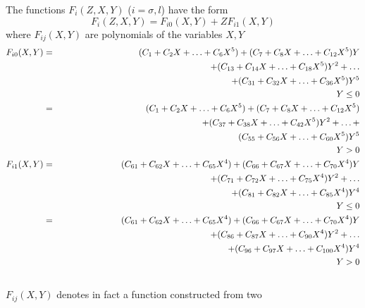 The functions $F_i(Z,X,Y)$ ($ i=\sigma,l $) have the form
\begin{equation}
 F_i(Z,X,Y) = F_{i0}(X,Y)+ZF_{i1}(X,Y)
\end{equation}
where $F_{ij}(X,Y)$ are polynomials of the variables $X,Y$
\begin{eqnarray}
F_{i0}(X,Y) & = &  (C_1+C_2X+\ldots+C_6X^5)+(C_7+C_8X+\ldots+C_{12}X^5)Y
                                                             \nonumber \\
          &   & +(C_{13}+C_{14}X+\ldots + C_{18}X^5)Y^2+\ldots \nonumber \\
          &   & +(C_{31}+C_{32}X+\ldots+C_{36}X^5)Y^5        \nonumber \\
          &   & \mbox{\hspace{11cm}}  Y\leq 0      \nonumber \\
          & = &  (C_1+C_2X+\ldots+C_6X^5)+(C_7+C_8X+\ldots+C_{12}X^5)
                                                             \nonumber \\
          &   & +(C_{37}+C_{38}X+\ldots+C_{42}X^5)Y^2+\ldots+ \nonumber \\
          &   &  (C_{55}+C_{56}X+\ldots+C_{60}X^5)Y^5        \nonumber \\
          &   & \mbox{\hspace{11cm}}  Y > 0        \nonumber \\
F_{i1}(X,Y) & = &  (C_{61}+C_{62}X+\ldots+C_{65}X^4)
                +(C_{66}+C_{67}X+\ldots+C_{70}X^4)Y          \nonumber \\
          &   & +(C_{71}+C_{72}X+\ldots+C_{75}X^4)Y^2+\ldots \nonumber \\
          &   & +(C_{81}+C_{82}X+\ldots+C_{85}X^4) Y^4       \nonumber \\
          &   &   \mbox{\hspace{11cm}}  Y\leq 0    \nonumber \\
          & = &  (C_{61}+C_{62}X+\ldots+C_{65}X^4)
                +(C_{66}+C_{67}X+\ldots+C_{70}X^4)Y          \nonumber \\
          &   & +(C_{86}+C_{87}X+\ldots+C_{90}X^4)Y^2+\ldots \nonumber \\
          &   & +(C_{96}+C_{97}X+\ldots+C_{100}X^4)Y^4       \nonumber  \\
          &   &  \mbox{\hspace{11cm}}  Y>0         \nonumber \\
           \nonumber
\end{eqnarray} 
$F_{ij}(X,Y)$ denotes in fact a function constructed from two
